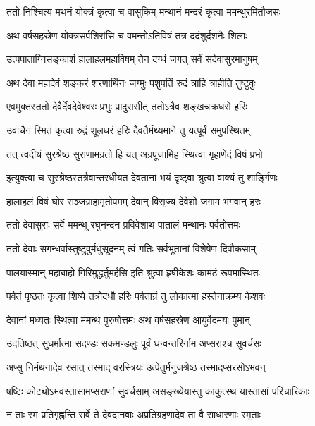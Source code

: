 \twolineshloka
{ततो निश्चित्य मथनं योक्त्रं कृत्वा च वासुकिम्}
{मन्थानं मन्दरं कृत्वा ममन्थुरमितौजसः} %

\twolineshloka
{अथ वर्षसहस्रेण योक्त्रसर्पशिरांसि च}
{वमन्तोऽतिविषं तत्र ददंशुर्दशनैः शिलाः} %

\twolineshloka
{उत्पपाताग्निसङ्काशं हालाहलमहाविषम्}
{तेन दग्धं जगत् सर्वं सदेवासुरमानुषम्} %

\twolineshloka
{अथ देवा महादेवं शङ्करं शरणार्थिनः}
{जग्मुः पशुपतिं रुद्रं त्राहि त्राहीति तुष्टुवुः} %

\twolineshloka
{एवमुक्तस्ततो देवैर्देवदेवेश्वरः प्रभुः}
{प्रादुरासीत् ततोऽत्रैव शङ्खचक्रधरो हरिः} %

\twolineshloka
{उवाचैनं स्मितं कृत्वा रुद्रं शूलधरं हरिः}
{दैवतैर्मथ्यमाने तु यत्पूर्वं समुपस्थितम्} %

\twolineshloka
{तत् त्वदीयं सुरश्रेष्ठ सुराणामग्रतो हि यत्}
{अग्रपूजामिह स्थित्वा गृहाणेदं विषं प्रभो} %

\twolineshloka
{इत्युक्त्वा च सुरश्रेष्ठस्तत्रैवान्तरधीयत}
{देवतानां भयं दृष्ट्वा श्रुत्वा वाक्यं तु शार्ङ्गिणः} %

\twolineshloka
{हालाहलं विषं घोरं सञ्जग्राहामृतोपमम्}
{देवान् विसृज्य देवेशो जगाम भगवान् हरः} %

\twolineshloka
{ततो देवासुराः सर्वे ममन्थू रघुनन्दन}
{प्रविवेशाथ पातालं मन्थानः पर्वतोत्तमः} %

\twolineshloka
{ततो देवाः सगन्धर्वास्तुष्टुवुर्मधुसूदनम्}
{त्वं गतिः सर्वभूतानां विशेषेण दिवौकसाम्} %

\twolineshloka
{पालयास्मान् महाबाहो गिरिमुद्धर्तुमर्हसि}
{इति श्रुत्वा हृषीकेशः कामठं रूपमास्थितः} %

\twolineshloka
{पर्वतं पृष्ठतः कृत्वा शिष्ये तत्रोदधौ हरिः}
{पर्वताग्रं तु लोकात्मा हस्तेनाक्रम्य केशवः} %

\twolineshloka
{देवानां मध्यतः स्थित्वा ममन्थ पुरुषोत्तमः}
{अथ वर्षसहस्रेण आयुर्वेदमयः पुमान्} %

\twolineshloka
{उदतिष्ठत् सुधर्मात्मा सदण्डः सकमण्डलुः}
{पूर्वं धन्वन्तरिर्नाम अप्सराश्च सुवर्चसः} %

\twolineshloka
{अप्सु निर्मथनादेव रसात् तस्माद् वरस्त्रियः}
{उत्पेतुर्मनुजश्रेष्ठ तस्मादप्सरसोऽभवन्} %

\twolineshloka
{षष्टिः कोट्योऽभवंस्तासामप्सराणां सुवर्चसाम्}
{असङ्ख्येयास्तु काकुत्स्थ यास्तासां परिचारिकाः} %

\twolineshloka
{न ताः स्म प्रतिगृह्णन्ति सर्वे ते देवदानवाः}
{अप्रतिग्रहणादेव ता वै साधारणाः स्मृताः} %

